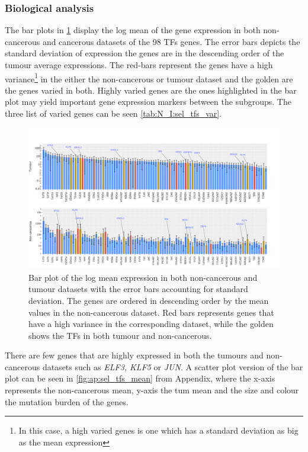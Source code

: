 \subsubsection{Biological analysis}

The bar plots in \cref{fig:N_I:sel_tfs_var} display the log mean of the gene expression in both non-cancerous and cancerous datasets of the 98 TFs genes. The error bars depicts the standard deviation of expression the genes are in the descending order of the tumour average expressions. The red-bars represent the genes have a high variance\footnote{In this case, a high varied genes is one which has a standard deviation as big as the mean expression} in the either the non-cancerous or tumour dataset and the golden are the genes varied in both. Highly varied genes are the ones highlighted in the bar plot may yield important gene expression markers between the subgroups. The three list of varied genes can be seen \cref{tab:N_I:sel_tfs_var}.


\begin{figure}[!ht]   
\centering
\includegraphics[width=1.0\textwidth,height=1.0\textheight,keepaspectratio]{Sections/Network_I/Resources/selective_pruning/sel_tfs_var_tum_healthy.png}
  \caption{Bar plot of the log mean expression in both non-cancerous and tumour datasets with the error bars accounting for standard deviation. The genes are ordered in descending order by the mean values in the non-cancerous dataset. Red bars represents genes that have a high variance in the corresponding dataset, while the golden shows the TFs in both tumour and non-cancerous.}
\label{fig:N_I:sel_tfs_var}
\end{figure}


There are few genes that are highly expressed in both the tumours and non-cancerous datasets such as \textit{ELF3, KLF5} or \textit{JUN}. A scatter plot version of the bar plot can be seen in \cref{fig:ap:sel_tfs_mean} from Appendix, where the x-axis represents the non-cancerous mean, y-axis the tum mean and the size and colour the mutation burden of the genes.

